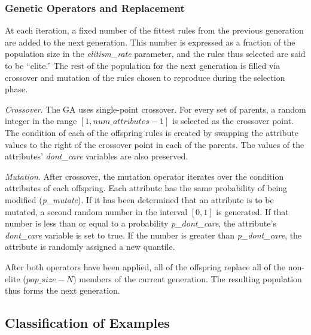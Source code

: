 \documentclass[12pt,twoside]{article}
\begin{document}
\subsubsection{Genetic Operators and Replacement}

At each iteration, a fixed number of the fittest rules from the previous generation are added to the next generation. This number is expressed as a fraction of the population size in the \emph{elitism\_rate} parameter, and the rules thus selected are said to be ``elite.'' The rest of the population for the next generation is filled via crossover and mutation of the rules chosen to reproduce during the selection phase.

\emph{Crossover}. The GA uses single-point crossover. For every set of parents, a random integer in the range $[1, num\_attributes - 1]$ is selected as the crossover point. The condition of each of the offspring rules is created by swapping the attribute values to the right of the crossover point in each of the parents. The values of the attributes' \emph{dont\_care} variables are also preserved.

\emph{Mutation}. After crossover, the mutation operator iterates over the condition attributes of each offspring. Each attribute has the same probability of being modified (\emph{p\_mutate}). If it has been determined that an attribute is to be mutated, a second random number in the interval $[0,1]$ is generated. If that number is less than or equal to a probability \emph{p\_dont\_care}, the attribute's \emph{dont\_care} variable is set to true. If the number is greater than \emph{p\_dont\_care}, the attribute is randomly assigned a new quantile.

After both operators have been applied, all of the offspring replace all of the non-elite ($pop\_size - N$) members of the current generation. The resulting population thus forms the next generation.

\subsection{Classification of Examples}
\end{document}
